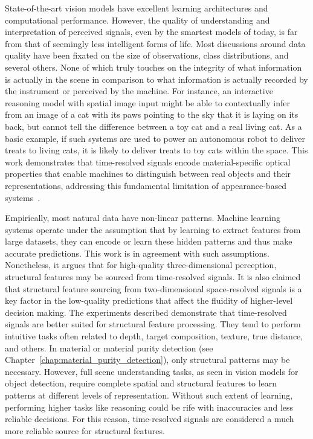 \documentclass[12pt,a4paper,oneside]{report}
\begin{document}
State-of-the-art vision models have excellent learning architectures and computational performance. However, the quality of understanding and interpretation of perceived signals, even by the smartest models of today, is far from that of seemingly less intelligent forms of life. Most discussions around data quality have been fixated on the size of observations, class distributions, and several others. None of which truly touches on the integrity of what information is actually in the scene in comparison to what information is actually recorded by the instrument or perceived by the machine. For instance, an interactive reasoning model with spatial image input might be able to contextually infer from an image of a cat with its paws pointing to the sky that it is laying on its back, but cannot tell the difference between a toy cat and a real living cat. As a basic example, if such systems are used to power an autonomous robot to deliver treats to living cats, it is likely to deliver treats to toy cats within the space. This work demonstrates that time-resolved signals encode material-specific optical properties that enable machines to distinguish between real objects and their representations, addressing this fundamental limitation of appearance-based systems~\cite{depthpro2024,gyongy2021}.

Empirically, most natural data have non-linear patterns. Machine learning systems operate under the assumption that by learning to extract features from large datasets, they can encode or learn these hidden patterns and thus make accurate predictions. This work is in agreement with such assumptions. Nonetheless, it argues that for high-quality three-dimensional perception, structural features may be sourced from time-resolved signals. It is also claimed that structural feature sourcing from two-dimensional space-resolved signals is a key factor in the low-quality predictions that affect the fluidity of higher-level decision making. The experiments described demonstrate that time-resolved signals are better suited for structural feature processing. They tend to perform intuitive tasks often related to depth, target composition, texture, true distance, and others. In material or material purity detection (see Chapter~\ref{chap:material_purity_detection}), only structural patterns may be necessary. However, full scene understanding tasks, as seen in vision models for object detection, require complete spatial and structural features to learn patterns at different levels of representation. Without such extent of learning, performing higher tasks like reasoning could be rife with inaccuracies and less reliable decisions. For this reason, time-resolved signals are considered a much more reliable source for structural features.
\end{document}
